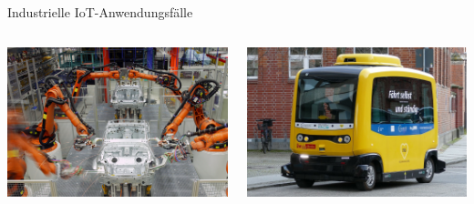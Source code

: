 \begin{frame}{Industrielle IoT-Anwendungsfälle}
    \begin{columns}
        \begin{column}[b]{.45\textwidth}
            \begin{center}
                \includegraphics[width=\textwidth]{img/iiot-fertigung}
            \end{center}
        \end{column}
        \begin{column}[b]{.45\textwidth}
            \begin{center}
                \includegraphics[width=\textwidth]{img/iiot-autonomes-fahren}
            \end{center}
        \end{column}
    \end{columns}


\end{frame}
